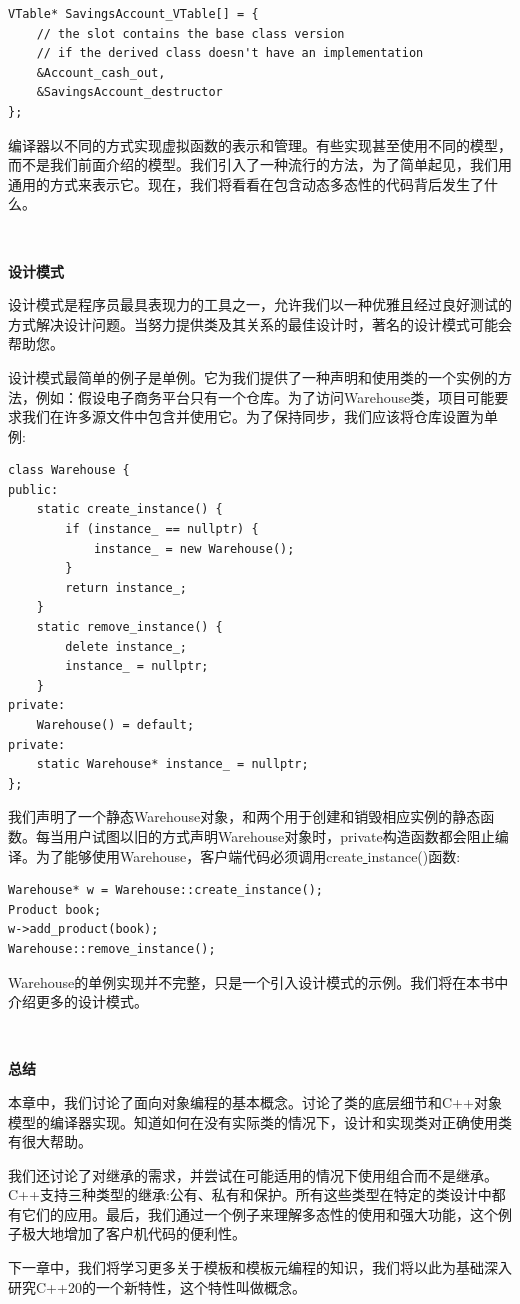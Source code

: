 \begin{lstlisting}[caption={}]
VTable* SavingsAccount_VTable[] = {
	// the slot contains the base class version
	// if the derived class doesn't have an implementation
	&Account_cash_out,
	&SavingsAccount_destructor
};
\end{lstlisting}

编译器以不同的方式实现虚拟函数的表示和管理。有些实现甚至使用不同的模型，而不是我们前面介绍的模型。我们引入了一种流行的方法，为了简单起见，我们用通用的方式来表示它。现在，我们将看看在包含动态多态性的代码背后发生了什么。\par

\noindent\textbf{}\ \par
\textbf{设计模式} \ \par
设计模式是程序员最具表现力的工具之一，允许我们以一种优雅且经过良好测试的方式解决设计问题。当努力提供类及其关系的最佳设计时，著名的设计模式可能会帮助您。 \par
设计模式最简单的例子是单例。它为我们提供了一种声明和使用类的一个实例的方法，例如：假设电子商务平台只有一个仓库。为了访问Warehouse类，项目可能要求我们在许多源文件中包含并使用它。为了保持同步，我们应该将仓库设置为单例: \par

\begin{lstlisting}[caption={}]
class Warehouse {
public:
	static create_instance() {
		if (instance_ == nullptr) {
			instance_ = new Warehouse();
		}
		return instance_;
	}
	static remove_instance() {
		delete instance_;
		instance_ = nullptr;
	}
private:
	Warehouse() = default;
private:
	static Warehouse* instance_ = nullptr;
};
\end{lstlisting}

我们声明了一个静态Warehouse对象，和两个用于创建和销毁相应实例的静态函数。每当用户试图以旧的方式声明Warehouse对象时，private构造函数都会阻止编译。为了能够使用Warehouse，客户端代码必须调用create\underline{ }instance()函数: \par

\begin{lstlisting}[caption={}]
Warehouse* w = Warehouse::create_instance();
Product book;
w->add_product(book);
Warehouse::remove_instance();
\end{lstlisting}

Warehouse的单例实现并不完整，只是一个引入设计模式的示例。我们将在本书中介绍更多的设计模式。\par

\noindent\textbf{}\ \par
\textbf{总结} \ \par
本章中，我们讨论了面向对象编程的基本概念。讨论了类的底层细节和C++对象模型的编译器实现。知道如何在没有实际类的情况下，设计和实现类对正确使用类有很大帮助。\par
我们还讨论了对继承的需求，并尝试在可能适用的情况下使用组合而不是继承。C++支持三种类型的继承:公有、私有和保护。所有这些类型在特定的类设计中都有它们的应用。最后，我们通过一个例子来理解多态性的使用和强大功能，这个例子极大地增加了客户机代码的便利性。 \par
下一章中，我们将学习更多关于模板和模板元编程的知识，我们将以此为基础深入研究C++20的一个新特性，这个特性叫做概念。 \par

